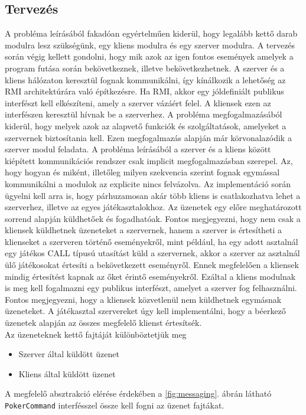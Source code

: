 \subsection{Tervezés}
A probléma leírásából fakadóan egyértelműen kiderül, hogy legalább kettő darab modulra lesz szükségünk, egy kliens modulra és egy szerver modulra. 
A tervezés során végig kellett gondolni, hogy mik azok az igen fontos események amelyek a program futása során bekövetkeznek, illetve bekövetkezhetnek. A szerver és a kliens hálózaton keresztül fognak kommunikálni, így kínálkozik a lehetőség az RMI architektúrára való építkezésre. Ha RMI, akkor egy jóldefiniált publikus interfészt kell elkészíteni, amely a szerver vázáért felel. A kliensek ezen az interfészen keresztül hívnak be a szerverhez. A probléma megfogalmazásából kiderül, hogy melyek azok az alapvető funkciók és szolgáltatások, amelyeket a szervernek biztosítania kell. Ezen megfogalmazás alapján már körvonalazódik a szerver modul feladata. A probléma leírásából a szerver és a kliens között kiépített kommunikációs rendszer csak implicit megfogalmazásban szerepel. Az, hogy hogyan és miként, illetőleg milyen szekvencia szerint fognak egymással kommunikálni a modulok az explicite nincs felvázolva. Az implementáció során ügyelni kell arra is, hogy párhuzamosan akár több kliens is csatlakozhatva lehet a szerverhez, illetve az egyes játékasztalokhoz. Az üzenetek egy előre meghatározott sorrend alapján küldhetőek és fogadhatóak. Fontos megjegyezni, hogy nem csak a kliensek küldhetnek üzeneteket a szervernek, hanem a szerver is értesítheti a klienseket a szerveren történő eseményekről, mint például, ha egy adott asztalnál egy játékos CALL típusú utasítást küld a szervernek, akkor a szerver az asztalnál ülő játékosokat értesíti a bekövetkezett eseményről. Ennek megfelelően a kliensek mindig értesítést kapnak az őket érintő eseményekről. Ezáltal a kliens modulnak is meg kell fogalmazni egy publikus interfészt, amelyet a szerver fog felhasználni. Fontos megjegyezni, hogy a kliensek közvetlenül nem küldhetnek egymásnak üzeneteket. A játékasztal szervereket úgy kell implementálni, hogy a béerkező üzenetek alapján az összes megfelelő klienst értesítsék. \\
Az üzeneteknek kettő fajtáját különböztetjük meg
 \begin{itemize}[leftmargin=2.7cm]
\item Szerver által küldött üzenet
\item Kliens által küldött üzenet
\end{itemize}
A megfelelő absztrakció elérése érdekében a \ref{fig:messaging}. ábrán látható \texttt{PokerCommand} interfésszel össze kell fogni az üzenet fajtákat.
